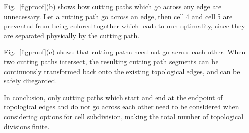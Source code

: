 \documentclass[journal]{IEEEtran}
\begin{document}
Fig.~\ref{figproof}(b) shows how cutting paths which go across any edge are unnecessary. %
Let a cutting path go across an edge, then cell 4 and cell 5 are prevented from being colored together which leads to non-optimality, since they are separated physically by the cutting path.

Fig.~\ref{figproof}(c) shows that cutting paths need not go across each other. When two cutting paths intersect, 
the resulting cutting path segments can be continuously transformed back onto the existing topological edges, and can be safely diregarded.



In conclusion, only cutting paths which start and end at the endpoint of topological edges and do not go across each other need to be considered when considering options for cell subdivision, making the total number of topological divisions finite. 
\end{document}
